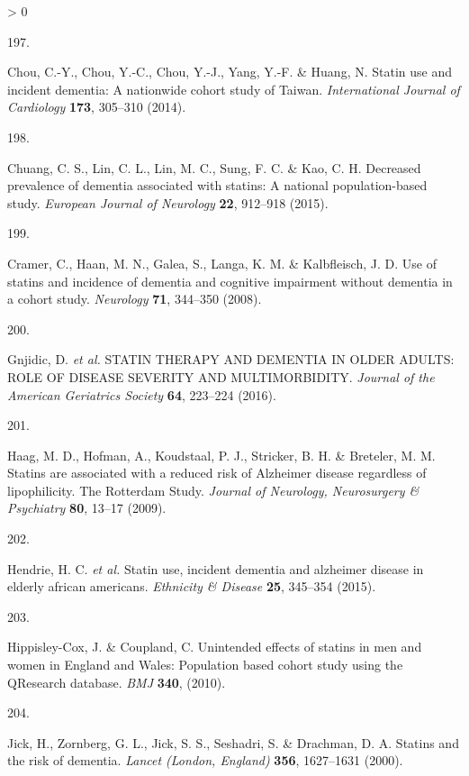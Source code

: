\documentclass[a4paper, twoside]{templates/ociamthesis}
\newlength{\cslhangindent}
\newlength{\csllabelwidth}
\newenvironment{CSLReferences}[3] %
 {%
  \setlength{\parindent}{0pt}
  \ifodd #1 \everypar{\setlength{\hangindent}{\cslhangindent}}\ignorespaces\fi
  \ifnum #2 > 0
  \setlength{\parskip}{#2\baselineskip}
  \fi
 }%
 {}
\newcommand{\CSLLeftMargin}[1]{\parbox[t]{\maxof{\widthof{#1}}{\csllabelwidth}}{#1}}
\newcommand{\CSLRightInline}[1]{\parbox[t]{\linewidth - \csllabelwidth}{#1}}
\begin{document}
\begin{CSLReferences}{0}{0}
\leavevmode\hypertarget{ref-chou2014}{}%
\CSLLeftMargin{197. }
\CSLRightInline{Chou, C.-Y., Chou, Y.-C., Chou, Y.-J., Yang, Y.-F. \& Huang, N. Statin use and incident dementia: A nationwide cohort study of {Taiwan}. \emph{International Journal of Cardiology} \textbf{173}, 305--310 (2014).}

\leavevmode\hypertarget{ref-chuang2015}{}%
\CSLLeftMargin{198. }
\CSLRightInline{Chuang, C. S., Lin, C. L., Lin, M. C., Sung, F. C. \& Kao, C. H. Decreased prevalence of dementia associated with statins: A national population-based study. \emph{European Journal of Neurology} \textbf{22}, 912--918 (2015).}

\leavevmode\hypertarget{ref-cramer2008}{}%
\CSLLeftMargin{199. }
\CSLRightInline{Cramer, C., Haan, M. N., Galea, S., Langa, K. M. \& Kalbfleisch, J. D. Use of statins and incidence of dementia and cognitive impairment without dementia in a cohort study. \emph{Neurology} \textbf{71}, 344--350 (2008).}

\leavevmode\hypertarget{ref-gnjidic2016}{}%
\CSLLeftMargin{200. }
\CSLRightInline{Gnjidic, D. \emph{et al.} {STATIN THERAPY AND DEMENTIA IN OLDER ADULTS}: {ROLE OF DISEASE SEVERITY AND MULTIMORBIDITY}. \emph{Journal of the American Geriatrics Society} \textbf{64}, 223--224 (2016).}

\leavevmode\hypertarget{ref-haag2009}{}%
\CSLLeftMargin{201. }
\CSLRightInline{Haag, M. D., Hofman, A., Koudstaal, P. J., Stricker, B. H. \& Breteler, M. M. Statins are associated with a reduced risk of {Alzheimer} disease regardless of lipophilicity. {The Rotterdam Study}. \emph{Journal of Neurology, Neurosurgery \& Psychiatry} \textbf{80}, 13--17 (2009).}

\leavevmode\hypertarget{ref-hendrie2015}{}%
\CSLLeftMargin{202. }
\CSLRightInline{Hendrie, H. C. \emph{et al.} Statin use, incident dementia and alzheimer disease in elderly african americans. \emph{Ethnicity \& Disease} \textbf{25}, 345--354 (2015).}

\leavevmode\hypertarget{ref-hippisley-cox2010}{}%
\CSLLeftMargin{203. }
\CSLRightInline{Hippisley-Cox, J. \& Coupland, C. Unintended effects of statins in men and women in {England} and {Wales}: Population based cohort study using the {QResearch} database. \emph{BMJ} \textbf{340}, (2010).}

\leavevmode\hypertarget{ref-jick2000}{}%
\CSLLeftMargin{204. }
\CSLRightInline{Jick, H., Zornberg, G. L., Jick, S. S., Seshadri, S. \& Drachman, D. A. Statins and the risk of dementia. \emph{Lancet (London, England)} \textbf{356}, 1627--1631 (2000).}


\end{CSLReferences}
\end{document}
